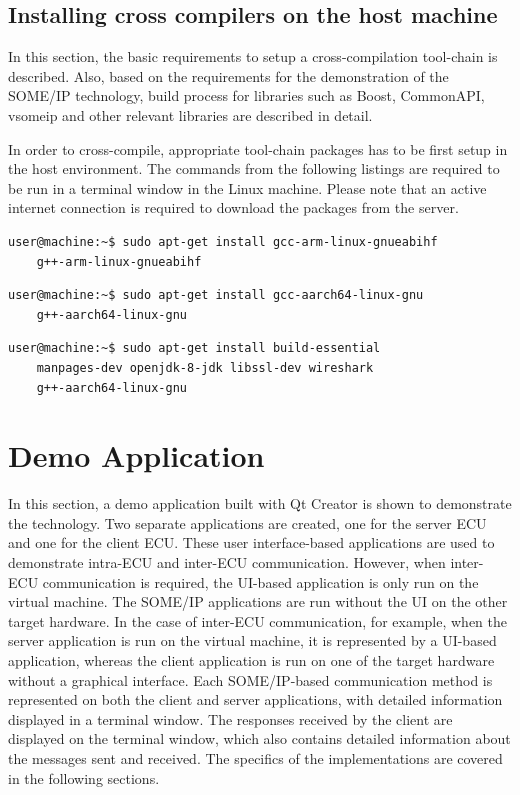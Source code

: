 \subsection{Installing cross compilers on the host machine}
In this section, the basic requirements to setup a cross-compilation tool-chain is described. Also, based on the requirements for the demonstration of the SOME/IP technology, build process for libraries such as Boost, CommonAPI, vsomeip and other relevant libraries are described in detail. 
\par In order to cross-compile, appropriate tool-chain packages has to be first setup in the host environment. The commands from the following listings are required to be run in a terminal window in the Linux machine. Please note that an active internet connection is required to download the packages from the server. 

\begin{lstlisting}[language=bash, caption={Command to install packages for ARM 32-bit (armv7) tool-chain}]
  user@machine:~$ sudo apt-get install gcc-arm-linux-gnueabihf
	g++-arm-linux-gnueabihf
\end{lstlisting}

\begin{lstlisting}[language=bash, caption={Command to install packages for ARM 64-bit(armv8) tool-chain}]
  user@machine:~$ sudo apt-get install gcc-aarch64-linux-gnu
	g++-aarch64-linux-gnu
\end{lstlisting}

\begin{lstlisting}[language=bash, caption={Command to install other required packages}]
  user@machine:~$ sudo apt-get install build-essential
	manpages-dev openjdk-8-jdk libssl-dev wireshark 
	g++-aarch64-linux-gnu
\end{lstlisting} 

\section{Demo Application}
In this section, a demo application built with Qt Creator is shown to demonstrate the technology. Two separate applications are created, one for the server ECU and one for the client ECU. These user interface-based applications are used to demonstrate intra-ECU and inter-ECU communication. However, when inter-ECU communication is required, the UI-based application is only run on the virtual machine. The SOME/IP applications are run without the UI on the other target hardware. In the case of inter-ECU communication, for example, when the server application is run on the virtual machine, it is represented by a UI-based application, whereas the client application is run on one of the target hardware without a graphical interface. Each SOME/IP-based communication method is represented on both the client and server applications, with detailed information displayed in a terminal window. The responses received by the client are displayed on the terminal window, which also contains detailed information about the messages sent and received. The specifics of the implementations are covered in the following sections.

